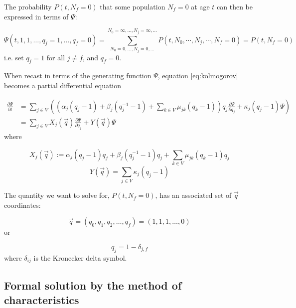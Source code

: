 \documentclass{article}
\begin{document}
The probability $P(t,N_f = 0)$ that some population $N_f = 0$ at age $t$ can
then be expressed in terms of $\Psi$:

\begin{equation}
    \Psi(t,1,1,\dots,q_j = 1,\dots, q_f = 0)
    = \sum_{N_0 = 0,\dots,N_j=0,\dots}^{N_0 = \infty,\dots, N_j = \infty, \dots}
        P(t, N_0, \cdots, N_j, \cdots, N_f = 0)
    = P(t,N_f = 0)
    \label{eq:corner}
\end{equation}
i.e. set $q_j = 1$ for all $j \neq f$, and $q_f = 0$.

When recast in terms of the generating function $\Psi$, equation
\eqref{eq:kolmogorov} becomes a partial differential equation

\begin{align}
    \frac{\partial \Psi}{\partial t} &= 
    \sum_{j \in V} \left(
    \left(
    \alpha_j (q_j - 1)
    + \beta_j (q_j^{-1} - 1)
    + \sum_{k \in V} \mu_{jk} (q_k - 1) 
    \right) q_j \frac{\partial  \Psi}{\partial q_j}
    +\kappa_j (q_j - 1)  \Psi \right)
    \nonumber \\
    &= \sum_{j \in V} X_j(\vec{q}) \frac{\partial \Psi}{\partial q_j}
    + Y(\vec{q}) \Psi 
    \label{eq:wave}
\end{align}
where

\begin{equation}
    X_j(\vec{q}) :=
    \alpha_j (q_j - 1) q_j
    + \beta_j (q_j^{-1} - 1) q_j
    + \sum_{k \in V} \mu_{jk} (q_k - 1) q_j
\end{equation}
\begin{equation}
    Y(\vec{q}) = \sum_{j \in V}\kappa_j (q_j - 1)
\end{equation}

The quantity we want to solve for, $P(t,N_f = 0)$, has an associated set of
$\vec{q}$ coordinates:

\begin{equation}
    \vec{q} = (q_0,q_1,q_2,\dots,q_f) = (1,1,1,\dots,0)
\end{equation}
or

\begin{equation}
    q_j = 1 - \delta_{j,f}
\end{equation}
where $\delta_{ij}$ is the Kronecker delta symbol.

\subsection{Formal solution by the method of characteristics}
\end{document}
